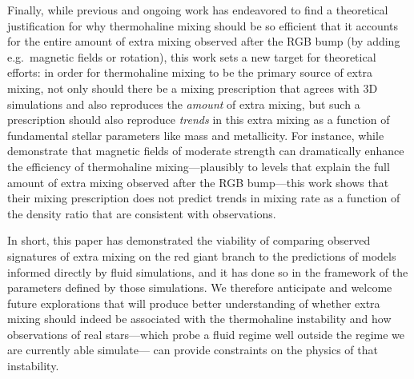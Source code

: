 Finally, while previous and ongoing work has endeavored to find a theoretical justification for why thermohaline mixing should be so efficient that it accounts for the entire amount of extra mixing observed after the RGB bump (by adding e.g.~magnetic fields or rotation), this work sets a new target for theoretical efforts: in order for thermohaline mixing to be the primary source of extra mixing, not only should there be a mixing prescription that agrees with 3D simulations and also reproduces the \textit{amount} of extra mixing, but such a prescription should also reproduce \textit{trends} in this extra mixing as a function of fundamental stellar parameters like mass and metallicity.
For instance, while \citet{harrington} demonstrate that magnetic fields of moderate strength can dramatically enhance the efficiency of thermohaline mixing---plausibly to levels that explain the full amount of extra mixing observed after the RGB bump---this work shows that their mixing prescription does not predict trends in mixing rate as a function of the density ratio that are consistent with observations.

In short, this paper has demonstrated the viability of comparing observed signatures of extra mixing on the red giant branch to the predictions of models informed directly by fluid simulations, and it has done so in the framework of the parameters defined by those simulations. We therefore anticipate and welcome future explorations that will produce better understanding of 
whether extra mixing should indeed be associated with the thermohaline instability and 
how observations of real stars---which probe a fluid regime well outside the regime we are currently able simulate--- can provide constraints on the physics of that instability.


